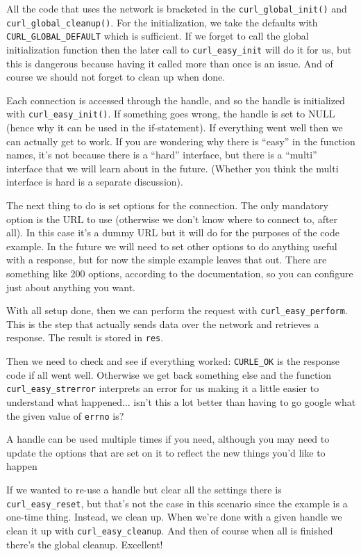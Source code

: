 All the code that uses the network is bracketed in the \texttt{curl\_global\_init()} and \texttt{curl\_global\_cleanup()}. For the initialization, we take the defaults with \texttt{CURL\_GLOBAL\_DEFAULT} which is sufficient. If we forget to call the global initialization function then the later call to \texttt{curl\_easy\_init} will do it for us, but this is dangerous because having it called more than once is an issue. And of course we should not forget to clean up when done.

Each connection is accessed through the handle, and so the handle is initialized with \texttt{curl\_easy\_init()}. If something goes wrong, the handle is set to NULL (hence why it can be used in the if-statement). If everything went well then we can actually get to work. If you are wondering why there is ``easy'' in the function names, it's not because there is a ``hard'' interface, but there is a ``multi'' interface that we will learn about in the future. (Whether you think the multi interface is hard is a separate discussion).

The next thing to do is set options for the connection. The only mandatory option is the URL to use (otherwise we don't know where to connect to, after all). In this case it's a dummy URL but it will do for the purposes of the code example. In the future we will need to set other options to do anything useful with a response, but for now the simple example leaves that out. There are something like 200 options, according to the documentation, so you can configure just about anything you want.

With all setup done, then we can perform the request with \texttt{curl\_easy\_perform}. This is the step that actually sends data over the network and retrieves a response. The result is stored in \texttt{res}.

Then we need to check and see if everything worked: \texttt{CURLE\_OK} is the response code if all went well. Otherwise we get back something else and the function \texttt{curl\_easy\_strerror} interprets an error for us making it a little easier to understand what happened... isn't this a lot better than having to go google what the given value of \texttt{errno} is?

A handle can be used multiple times if you need, although you may need to update the options that are set on it to reflect the new things you'd like to happen

If we wanted to re-use a handle but clear all the settings there is \texttt{curl\_easy\_reset}, but that's not the case in this scenario since the example is a one-time thing. Instead, we clean up. When we're done with a given handle we clean it up with \texttt{curl\_easy\_cleanup}. And then of course when all is finished there's the global cleanup. Excellent!

